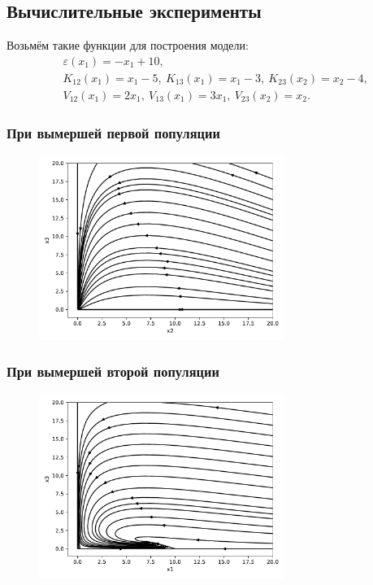 \subsection{Вычислительные эксперименты}
    Возьмём такие функции для построения модели:
    \[
        \begin{split}
            & \varepsilon (x_1) = -x_1 + 10, \\
            & K_{12} (x_1) = x_1 - 5, ~ K_{13} (x_1) = x_1 - 3, ~ K_{23} (x_2) = x_2 - 4, \\
            & V_{12} (x_1) = 2 x_1, ~ V_{13} (x_1) = 3 x_1, ~ V_{23} (x_2) = x_2.
        \end{split}
    \]

    \subsubsection{При вымершей первой популяции}

    \begin{figure}[H]
        \centering
        \includegraphics[width=8cm]{pictures/kx1_0vector.pdf}
    \end{figure}


    \subsubsection{При вымершей второй популяции}

    \begin{figure}[H]
        \centering
        \includegraphics[width=8cm]{pictures/kx2_0vector.pdf}
    \end{figure}



